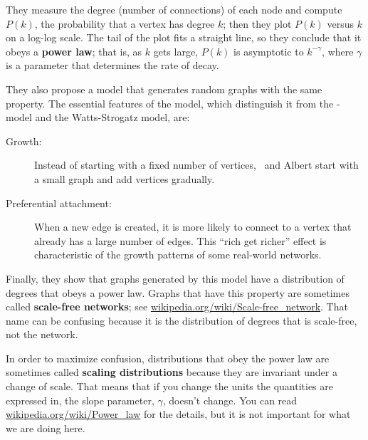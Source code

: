\documentclass[10pt]{book}
\begin{document}
They measure the degree (number of connections) of each node and
compute $P(k)$, the probability that a vertex has degree $k$; then
they plot $P(k)$ versus $k$ on a log-log scale.  The tail of the plot
fits a straight line, so they conclude that it obeys a {\bf power
  law}; that is, as $k$ gets large, $P(k)$ is asymptotic to
$k^{- \gamma}$, where $\gamma$ is a parameter that determines the rate
of decay.

They also propose a model that generates random graphs with the same
property.  The essential features of the model, which distinguish it
from the \Erdos-\Renyi~ model and the Watts-Strogatz model, are:

\begin{description}

\item[Growth:]  Instead of starting with a fixed number of vertices,
\Barabasi~and Albert start with a small graph and add vertices gradually.

\item[Preferential attachment:] When a new edge is created, it is
more likely to connect to a vertex that already has a large number
of edges.  This ``rich get richer'' effect is characteristic of
the growth patterns of some real-world networks.

\end{description}

Finally, they show that graphs generated by this model have a
distribution of degrees that obeys a power law.  Graphs that
have this property are sometimes called {\bf scale-free networks};
see \url{wikipedia.org/wiki/Scale-free_network}.
That name can be confusing because it is the distribution
of degrees that is scale-free, not the network.

In order to maximize confusion, distributions that obey the power law
are sometimes called {\bf scaling distributions} because they are
invariant under a change of scale.  That means that if you change the
units the quantities are expressed in, the slope parameter, $\gamma$,
doesn't change.  You can read \url{wikipedia.org/wiki/Power_law} for
the details, but it is not important for what we are doing here.
\end{document}

